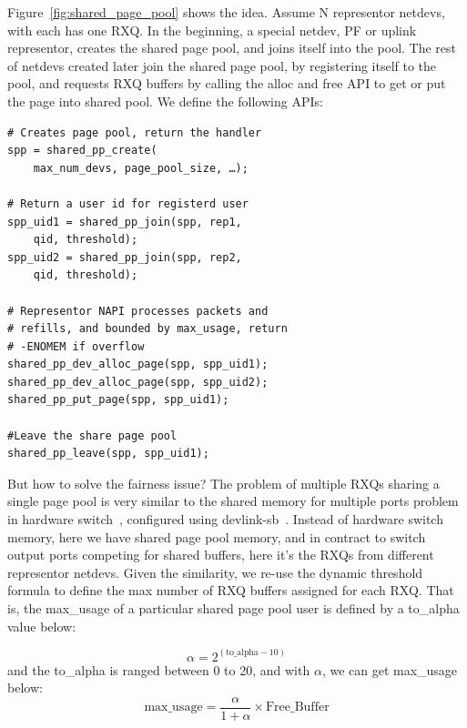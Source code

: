 \documentclass[letterpaper]{article}
\begin{document}
Figure~\ref{fig:shared_page_pool} shows the idea.
Assume N representor netdevs, with each has one RXQ. In the beginning,
a special netdev, PF or uplink representor, creates the shared page pool,
and joins itself into the pool. The rest of netdevs created later join the shared page pool,
by registering itself to the pool, and requests RXQ buffers by calling
the alloc and free API to get or put the page into shared pool.
We define the following APIs:
\begin{verbatim}
# Creates page pool, return the handler
spp = shared_pp_create(
    max_num_devs, page_pool_size, …);

# Return a user id for registerd user
spp_uid1 = shared_pp_join(spp, rep1,
    qid, threshold);
spp_uid2 = shared_pp_join(spp, rep2,
    qid, threshold);
    
# Representor NAPI processes packets and
# refills, and bounded by max_usage, return
# -ENOMEM if overflow
shared_pp_dev_alloc_page(spp, spp_uid1);
shared_pp_dev_alloc_page(spp, spp_uid2);
shared_pp_put_page(spp, spp_uid1);

#Leave the share page pool
shared_pp_leave(spp, spp_uid1); 
\end{verbatim}

But how to solve the fairness issue?
The problem of multiple RXQs sharing a single page pool is
very similar to the shared memory for multiple ports problem in
hardware switch~\cite{queuelength}, configured using devlink-sb~\cite{devlinksb}.
Instead of hardware switch memory, here we have shared page pool memory,
and in contract to switch output ports competing for shared buffers,
here it's the RXQs from different representor netdevs.
Given the similarity, we re-use the dynamic threshold formula to define
the max number of RXQ buffers assigned for each RXQ. That is,
the max\_usage of a particular shared page pool user is
defined by a to\_alpha value below:

\begin{equation}
\alpha = 2^{(\text{to\_alpha} - 10)}
\end{equation}
and the to\_alpha is ranged between 0 to 20, and with $\alpha$, we can get
max\_usage below:
\begin{equation}
\text{max\_usage} = \frac{\alpha}{1 + \alpha} \times \text{Free\_Buffer}
\end{equation}
\end{document}
